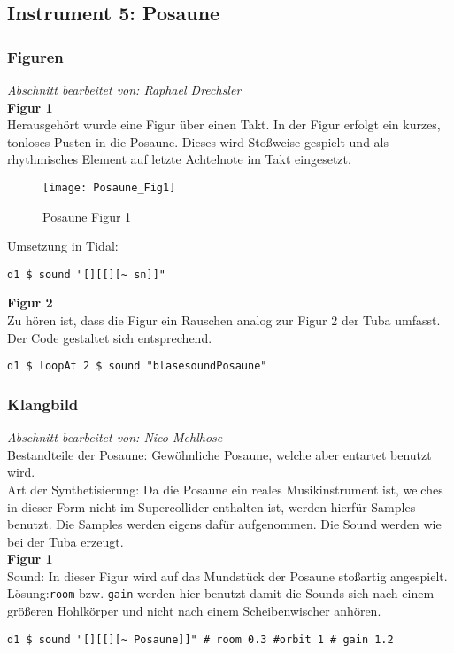\documentclass[
10pt, %
a4paper, %
oneside, %
headinclude,footinclude, %
BCOR5mm, %
]{scrartcl}
\begin{document}
\subsection{Instrument 5: Posaune}
\subsubsection{Figuren}
\textit{Abschnitt bearbeitet von: Raphael Drechsler}\\

\noindent\textbf{Figur 1}\\
Herausgehört wurde eine Figur über einen Takt. In der Figur erfolgt ein kurzes, tonloses Pusten in die Posaune. Dieses wird Stoßweise gespielt und als rhythmisches Element auf letzte Achtelnote im Takt eingesetzt.
\begin{figure}[h]
	\centering 
	\texttt{[image: Posaune\_Fig1]} 
	\caption{Posaune Figur 1}
\end{figure}

\noindent Umsetzung in Tidal:
\begin{lstlisting}
d1 $ sound "[][[][~ sn]]"
\end{lstlisting}


\noindent\textbf{Figur 2}\\
Zu hören ist, dass die Figur ein Rauschen analog zur Figur 2 der Tuba umfasst. Der Code gestaltet sich entsprechend.
\begin{lstlisting}
d1 $ loopAt 2 $ sound "blasesoundPosaune"
\end{lstlisting}

\subsubsection{Klangbild}
\textit{Abschnitt bearbeitet von: Nico Mehlhose}\\

\noindent 
Bestandteile der Posaune: Gewöhnliche Posaune, welche aber entartet benutzt wird.\\
Art der Synthetisierung: Da die Posaune ein reales Musikinstrument ist, welches in dieser Form nicht im Supercollider enthalten ist,
werden hierfür Samples benutzt. Die Samples werden eigens dafür aufgenommen. Die Sound werden wie bei der Tuba erzeugt.\\

\noindent\textbf{Figur 1}\\
 Sound: In dieser Figur wird auf das Mundstück der Posaune stoßartig angespielt.\\
Lösung:\verb|room| bzw. \verb|gain| werden hier benutzt damit die Sounds sich nach einem größeren Hohlkörper und nicht nach einem Scheibenwischer anhören.
\begin{lstlisting}
d1 $ sound "[][[][~ Posaune]]" # room 0.3 #orbit 1 # gain 1.2
\end{lstlisting}
\end{document}
